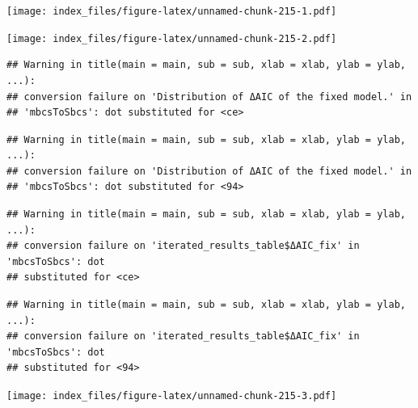 \documentclass[
]{article}
\newenvironment{Shaded}{\begin{snugshade}}{\end{snugshade}}
\newcommand{\AttributeTok}[1]{\textcolor[rgb]{0.77,0.63,0.00}{#1}}
\newcommand{\FunctionTok}[1]{\textcolor[rgb]{0.00,0.00,0.00}{#1}}
\newcommand{\NormalTok}[1]{#1}
\newcommand{\SpecialCharTok}[1]{\textcolor[rgb]{0.00,0.00,0.00}{#1}}
\newcommand{\StringTok}[1]{\textcolor[rgb]{0.31,0.60,0.02}{#1}}
\begin{document}
\texttt{[image: index\_files/figure-latex/unnamed-chunk-215-1.pdf]}

\begin{Shaded}
\end{Shaded}

\texttt{[image: index\_files/figure-latex/unnamed-chunk-215-2.pdf]}

\begin{Shaded}
\end{Shaded}

\begin{verbatim}
## Warning in title(main = main, sub = sub, xlab = xlab, ylab = ylab, ...):
## conversion failure on 'Distribution of ΔAIC of the fixed model.' in
## 'mbcsToSbcs': dot substituted for <ce>
\end{verbatim}

\begin{verbatim}
## Warning in title(main = main, sub = sub, xlab = xlab, ylab = ylab, ...):
## conversion failure on 'Distribution of ΔAIC of the fixed model.' in
## 'mbcsToSbcs': dot substituted for <94>
\end{verbatim}

\begin{verbatim}
## Warning in title(main = main, sub = sub, xlab = xlab, ylab = ylab, ...):
## conversion failure on 'iterated_results_table$ΔAIC_fix' in 'mbcsToSbcs': dot
## substituted for <ce>
\end{verbatim}

\begin{verbatim}
## Warning in title(main = main, sub = sub, xlab = xlab, ylab = ylab, ...):
## conversion failure on 'iterated_results_table$ΔAIC_fix' in 'mbcsToSbcs': dot
## substituted for <94>
\end{verbatim}

\texttt{[image: index\_files/figure-latex/unnamed-chunk-215-3.pdf]}

\begin{Shaded}
\end{Shaded}
\end{document}
